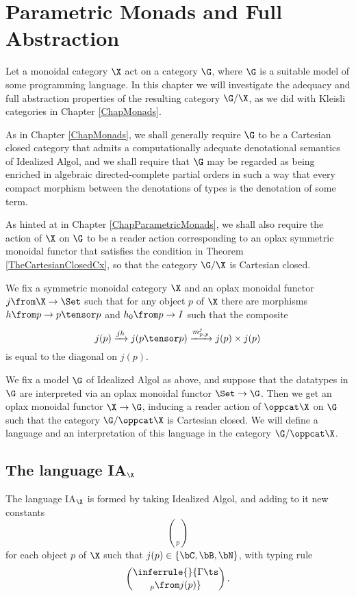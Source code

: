 \chapter{Parametric Monads and Full Abstraction}
\label{ChapParametricMonadsFullAbstraction}

Let a monoidal category $\X$ act on a category $\G$, where $\G$ is a suitable model of some programming language.  
In this chapter we will investigate the adequacy and full abstraction properties of the resulting category $\G/\X$, as we did with Kleisli categories in Chapter \ref{ChapMonads}.  

As in Chapter \ref{ChapMonads}, we shall generally require $\G$ to be a Cartesian closed category that admits a computationally adequate denotational semantics of Idealized Algol, and we shall require that $\G$ may be regarded as being enriched in algebraic directed-complete partial orders in such a way that every compact morphism between the denotations of types is the denotation of some term.

As hinted at in Chapter \ref{ChapParametricMonads}, we shall also require the action of $\X$ on $\G$ to be a reader action corresponding to an oplax symmetric monoidal functor that satisfies the condition in Theorem \ref{TheCartesianClosedCx}, so that the category $\G/\X$ is Cartesian closed.

We fix a symmetric monoidal category $\X$ and an oplax monoidal functor $j\from \X \to \Set$ such that for any object $p$ of $\X$ there are morphisms $h\from p \to p \tensor p$ and $h_0 \from p \to I$ such that the composite
\[
  j(p) \xrightarrow{jh} j(p\tensor p) \xrightarrow{m^j_{p,p}} j(p) \times j(p)
  \]
is equal to the diagonal on $j(p)$.

We fix a model $\G$ of Idealized Algol as above, and suppose that the datatypes in $\G$ are interpreted via an oplax monoidal functor $\Set \to \G$.  
Then we get an oplax monoidal functor $\X \to \G$, inducing a reader action of $\oppcat\X$ on $\G$ such that the category $\G/\oppcat\X$ is Cartesian closed.  
We will define a language and an interpretation of this language in the category $\G/\oppcat\X$.

\newcommand{\IAXX}{{IA${}_{\X}$}\xspace}
\section{The language \IAXX}

\begin{definition}[{The language \IAXX}]
  The language \IAXX is formed by taking Idealized Algol, and adding to it new constants
  \[
    \choose_p
    \]
  for each object $p$ of $\X$ such that $j(p)\in\{\bC,\bB,\bN\}$, with typing rule
  \[
    \inferrule{ }{\Gamma \ts \choose_p \from j(p)}\,.
    \]
\end{definition}

